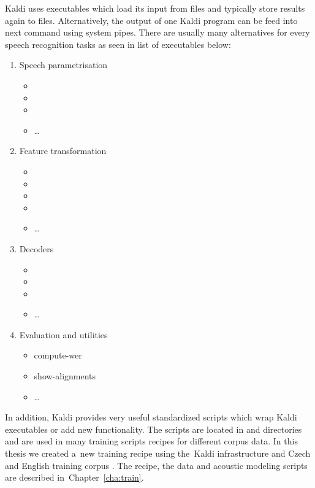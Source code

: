 Kaldi uses executables which load its input from files and typically store results again to files.
Alternatively, the output of one Kaldi program can be feed into next command using system pipes.
There are usually many alternatives for every speech recognition tasks as seen in list of executables below:
\begin{enumerate}
    \item Speech parametrisation
        \begin{itemize}
            \item {}
            \item {}
            \item {}
            \item \ldots
        \end{itemize}
    \item Feature transformation
        \begin{itemize}
            \item {}
            \item {}
            \item {}
            \item {}
            \item \ldots
        \end{itemize}
    \item Decoders
        \begin{itemize}
            \item {}
            \item {}
            \item {}
            \item \ldots
        \end{itemize}
    \item Evaluation and utilities
        \begin{itemize}
            \item compute-wer
            \item show-alignments
            \item \ldots
        \end{itemize}
\end{enumerate}
In addition, Kaldi provides very useful standardized scripts which wrap Kaldi executables or add new functionality. 
The scripts are located in  and  directories and are used in many training scripts recipes for different corpus data.
In this thesis we created a~new training recipe using the~Kaldi infrastructure and Czech and English training corpus \cite{korvas_2014}.
The recipe, the data and acoustic modeling scripts are described in~Chapter~\ref{cha:train}.

